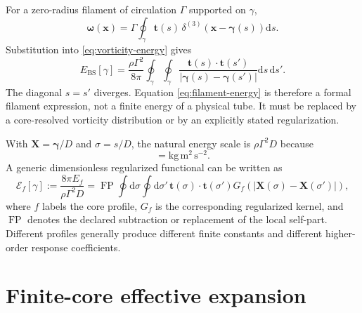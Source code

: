 \documentclass[aps,pre,preprint,notitlepage,nofootinbib,superscriptaddress]{revtex4-2}
\newcommand{\dd}{\mathrm d}
\newcommand{\FP}{\operatorname{FP}}
\newcommand{\calE}{\mathcal E}
\begin{document}
For a zero-radius filament of circulation $\Gamma$ supported on $\gamma$,
\begin{equation}
  \bm\omega(\bm x)=\Gamma\oint_\gamma
  \bm t(s)\,\delta^{(3)}\!\left(\bm x-\bm\gamma(s)\right)\dd s.
  \label{eq:filament-vorticity}
\end{equation}
Substitution into \cref{eq:vorticity-energy} gives
\begin{equation}
  \boxed{
  E_{\mathrm{BS}}[\gamma]
  =\frac{\rho\Gamma^2}{8\pi}
  \oint_\gamma\!\oint_\gamma
  \frac{\bm t(s)\cdot\bm t(s')}
       {|\bm\gamma(s)-\bm\gamma(s')|}
  \dd s\,\dd s'.}
  \label{eq:filament-energy}
\end{equation}
The diagonal $s=s'$ diverges.  Equation \eqref{eq:filament-energy} is therefore a formal filament expression, not a finite energy of a physical tube.  It must be replaced by a core-resolved vorticity distribution or by an explicitly stated regularization.

With $\bm X=\bm\gamma/D$ and $\sigma=s/D$, the natural energy scale is $\rho\Gamma^2D$ because
\begin{equation}
  [\rho\Gamma^2D]=\mathrm{kg\,m^2\,s^{-2}}.
\end{equation}
A generic dimensionless regularized functional can be written as
\begin{equation}
  \calE_f[\gamma]
  :=\frac{8\pi E_f}{\rho\Gamma^2D}
  =\FP\oint\!\dd\sigma\oint\!\dd\sigma'\,
  \bm t(\sigma)\cdot\bm t(\sigma')
  G_f\!\left(|\bm X(\sigma)-\bm X(\sigma')|\right),
  \label{eq:regularized-energy}
\end{equation}
where $f$ labels the core profile, $G_f$ is the corresponding regularized kernel, and $\FP$ denotes the declared subtraction or replacement of the local self-part.  Different profiles generally produce different finite constants and different higher-order response coefficients.

\section{Finite-core effective expansion}
\label{sec:effective-expansion}
\end{document}

